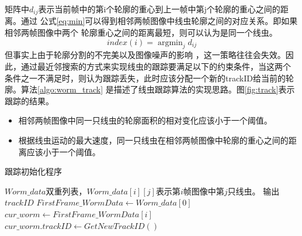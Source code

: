 	矩阵中$d_{ij}$表示当前帧中的第i个轮廓的重心到上一帧中第j个轮廓的重心之间的距离。通过
	公式\ref{eq:min}可以得到相邻两帧图像中线虫轮廓之间的对应关系。即如果相邻两帧图像中两个
	轮廓重心之间的距离最短，则可以认为是同一个线虫。
		\begin{equation}
        index(i)=\mathop{\arg\min}_{j} d_{ij}\label{eq:min}
		\end{equation}
	但事实上由于轮廓分割的不完美以及图像噪声的影响
	，这一策略往往会失效。因此，通过最近邻搜索的方式来实现线虫的跟踪要满足以下的约束条件，当这两个
	条件之一不满足时，则认为跟踪丢失，此时应该分配一个新的trackID给当前的轮廓。算法\ref{algo:worm_track}
	是描述了线虫跟踪算法的实现思路。图\ref{fig:track}表示跟踪的结果。
	
	\begin{itemize}
	  \item 相邻两帧图像中同一只线虫的轮廓面积的相对变化应该小于一个阈值。
	  \item 根据线虫运动的最大速度，同一只线虫在相邻两帧图像中轮廓的重心之间的距离应该小于一个阈值。
	\end{itemize}

\begin{algorithm}
\caption{跟踪初始化程序}
\label{algo:initial_track}
\begin{algorithmic}[1]
	\Require $Worm\_data$双重列表，$Worm\_data[i][j]$表示第$i$帧图像中第$j$只线虫。
	\Ensure 输出$trackID$
		\State $FirstFrame\_WormData \gets Worm\_data[0]$
			\State $cur\_worm \gets FirstFrame\_WormData[i]$
			\State $cur\_worm.trackID \gets GetNewTrackID()$
		\EndFor
\EndFunction
\end{algorithmic}
\end{algorithm}

